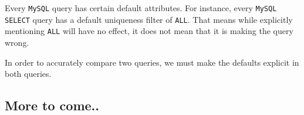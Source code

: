 Every \texttt{MySQL} query has certain default attributes. For instance, every \texttt{MySQL SELECT} query has a default uniqueness filter of \texttt{ALL}. That means while explicitly mentioning \texttt{ALL} will have no effect, it does not mean that it is making the query wrong.

In order to accurately compare two queries, we must make the defaults explicit in both queries.

\subsection{More to come..}